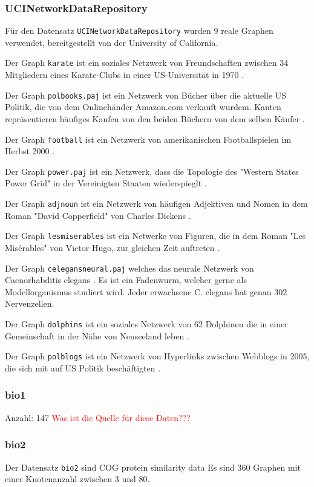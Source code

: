 \documentclass[12pt,a4paper,onecolumn,oneside,titlepage]{article}
\newcommand{\vars}{\texttt}
\newcommand\todo[1]{\textcolor{red}{#1}}
\begin{document}
\subsubsection{UCINetworkDataRepository}
Für den Datensatz \vars{UCINetworkDataRepository} wurden 9 reale Graphen verwendet, bereitgestellt von der University of California.

Der Graph \vars{karate} ist ein soziales Netzwerk von Freundschaften zwischen 34 Mitgliedern eines Karate-Clubs in einer US-Universität in 1970 \cite{Zachary77}.

Der Graph \vars{polbooks.paj} ist ein Netzwerk von Bücher über die aktuelle US Politik, die von dem Onlinehänder Amazon.com verkauft wurdem. Kanten repräsentieren häufiges Kaufen von den beiden Büchern von dem selben Käufer \cite{polbooks}.

Der Graph \vars{football} ist ein Netzwerk von amerikanischen Footballspielen im Herbst 2000 \cite{Girvan02}.

Der Graph \vars{power.paj} ist ein Netzwerk, dass die Topologie des "Western States Power Grid" in der Vereinigten Staaten wiederspieglt  \cite{Watts98}.

Der Graph \vars{adjnoun} ist ein Netzwerk von häufigen Adjektiven und Nomen in dem Roman "David Copperfield" von Charles Dickens \cite{Newman06}.

Der Graph \vars{lesmiserables} ist ein Netwerke von Figuren, die in dem  Roman "Les Misérables" von Victor Hugo, zur gleichen Zeit auftreten \cite{Knuth93}. 


Der Graph \vars{celegansneural.paj} welches das neurale Netzwerk von Caenorhabditis elegans \cite{Watts98}. Es ist ein Fadenwurm, welcher gerne als Modellorganismus studiert wird. Jeder erwachsene C. elegans hat genau 302 Nervenzellen.


Der Graph \vars{dolphins} ist ein soziales Netzwerk von 62 Dolphinen die in einer Gemeinschaft in der Nähe von Neuseeland leben \cite{Lusseau03}. 

Der Graph \vars{polblogs} ist ein Netzwerk von Hyperlinks zwischen Webblogs in 2005, die sich mit auf US Politik beschäftigten \cite{Adamic05}.

\subsubsection{bio1}
Anzahl: 147
\todo{Was ist die Quelle für diese Daten???}
\subsubsection{bio2}
Der Datensatz \vars{bio2} sind COG protein similarity data \cite{Rahmann07} \cite{Bocker08}
Es sind 360 Graphen mit einer Knotenanzahl zwischen 3 und 80.
\end{document}
